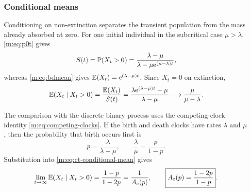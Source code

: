 \subsubsection{Conditional means}\label{m:sec:conditional-means}

Conditioning on non-extinction separates the transient population from the mass
already absorbed at zero.  For one initial individual in the subcritical case
$\mu>\lambda$, \cref{m:eq:p0t} gives
\begin{equation}
  S(t)=\mathbb{P}\!\left(X_t>0\right)
  =\frac{\lambda-\mu}{\lambda-\mu\mathrm{e}^{(\mu-\lambda)t}},
  \label{m:eq:ct-survival}
\end{equation}
whereas \cref{m:eq:bdmean} gives
$\mathbb{E}\!\left(X_t\right)=\mathrm{e}^{(\lambda-\mu)t}$.  Since $X_t=0$ on extinction,
\begin{equation}
  \mathbb{E}\!\left(X_t\mid X_t>0\right)
  =\frac{\mathbb{E}\!\left(X_t\right)}{S(t)}
  =\frac{\lambda\mathrm{e}^{(\lambda-\mu)t}-\mu}{\lambda-\mu}
  \longrightarrow\frac{\mu}{\mu-\lambda}.
  \label{m:eq:ct-conditional-mean}
\end{equation}

The comparison with the discrete binary process uses the competing-clock identity
\cref{m:eq:competing-clocks}.  If the birth and death clocks have rates $\lambda$
and $\mu$, then the probability that birth occurs first is
\begin{equation}
  p=\frac{\lambda}{\lambda+\mu},
  \qquad \frac{\lambda}{\mu}=\frac{p}{1-p}.
  \label{m:eq:rate-match}
\end{equation}
Substitution into \cref{m:eq:ct-conditional-mean} gives
\begin{equation}
  \lim_{t\to\infty}\mathbb{E}\!\left(X_t\mid X_t>0\right)
  =\frac{1-p}{1-2p}=\frac{1}{A_{\mathrm{c}}(p)},
  \qquad
  \boxed{A_{\mathrm{c}}(p)=\frac{1-2p}{1-p}}.
  \label{m:eq:Acts}
\end{equation}

